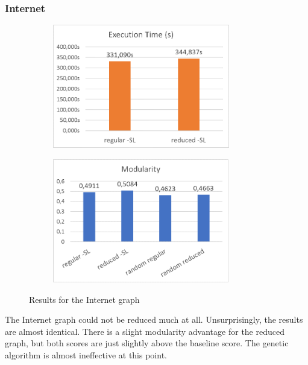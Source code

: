 \subsubsection{Internet}
\begin{figure}[H]
\begin{center}
    \begin{subfigure}{0.47\textwidth}
    \begin{center}
    \includegraphics[height=5.4cm]{images/internettime.png}
    \end{center}
    \end{subfigure}
    \begin{subfigure}{0.47\textwidth}
    \begin{center}
    \includegraphics[height=5.4cm]{images/internetfitness.png}
    \end{center}
    \end{subfigure}
\caption{Results for the Internet graph}\label{fig:internet}
\end{center}
\end{figure}
The Internet graph could not be reduced much at all. Unsurprisingly, the results are almost identical. There is a slight modularity advantage for the reduced graph, but both scores are just slightly above the baseline score. The genetic algorithm is almost ineffective at this point.
